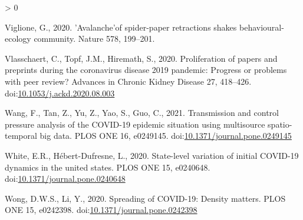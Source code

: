 \documentclass[]{elsarticle} %
\newlength{\cslhangindent}
\newenvironment{CSLReferences}[2] %
 {%
  \setlength{\parindent}{0pt}
  \ifodd #1 \everypar{\setlength{\hangindent}{\cslhangindent}}\ignorespaces\fi
  \ifnum #2 > 0
  \setlength{\parskip}{#2\baselineskip}
  \fi
 }%
 {}
\begin{document}
\begin{CSLReferences}{1}{0}
\leavevmode\hypertarget{ref-Viglione2020avalanche}{}%
Viglione, G., 2020. 'Avalanche'of spider-paper retractions shakes
behavioural-ecology community. Nature 578, 199--201.

\leavevmode\hypertarget{ref-Vlasschaert2020proliferation}{}%
Vlasschaert, C., Topf, J.M., Hiremath, S., 2020. Proliferation of papers
and preprints during the coronavirus disease 2019 pandemic: Progress or
problems with peer review? Advances in Chronic Kidney Disease 27,
418--426.
doi:\href{https://doi.org/10.1053/j.ackd.2020.08.003}{10.1053/j.ackd.2020.08.003}

\leavevmode\hypertarget{ref-Wang2021transmission}{}%
Wang, F., Tan, Z., Yu, Z., Yao, S., Guo, C., 2021. Transmission and
control pressure analysis of the COVID-19 epidemic situation using
multisource spatio-temporal big data. PLOS ONE 16, e0249145.
doi:\href{https://doi.org/10.1371/journal.pone.0249145}{10.1371/journal.pone.0249145}

\leavevmode\hypertarget{ref-White2020state}{}%
White, E.R., Hébert-Dufresne, L., 2020. State-level variation of initial
COVID-19 dynamics in the united states. PLOS ONE 15, e0240648.
doi:\href{https://doi.org/10.1371/journal.pone.0240648}{10.1371/journal.pone.0240648}

\leavevmode\hypertarget{ref-Wong2020spreading}{}%
Wong, D.W.S., Li, Y., 2020. Spreading of COVID-19: Density matters. PLOS
ONE 15, e0242398.
doi:\href{https://doi.org/10.1371/journal.pone.0242398}{10.1371/journal.pone.0242398}

\end{CSLReferences}
\end{document}
